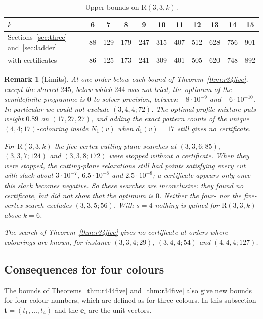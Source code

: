 \documentclass[11pt]{article}
\theoremstyle{spacedplain}
\theoremstyle{spaceddef}
\theoremstyle{spacedremark}
\newtheorem{remark}[theorem]{Remark}
\newcommand{\R}{\mathrm{R}}
\newcommand{\bt}{\mathbf{t}}
\newcommand{\e}{\mathbf{e}}
\begin{document}
\begin{table}[htbp]
\centering\small
\begin{tabular}{l*{10}{c}}
\toprule
$k$ & 6 & 7 & 8 & 9 & 10 & 11 & 12 & 13 & 14 & 15\\
\midrule
Sections~\ref{sec:three} and~\ref{sec:ladder} & 88 & 129 & 179 & 247 & 315 & 407 & 512 & 628 & 756 & 901\\
with certificates & 86 & 125 & 173 & 241 & 309 & 401 & 505 & 620 & 748 & 892\\
\bottomrule
\end{tabular}
\caption{Upper bounds on $\R(3,3,k)$.}
\label{tab:flagladder}
\end{table}

\begin{remark}[Limits]\label{rem:limits}
At one order below each bound of Theorem~\ref{thm:r34five}, except the starred $245$, below which $244$ was not tried, the optimum of the semidefinite programme is $0$ to solver precision, between $-8\cdot10^{-9}$ and $-6\cdot10^{-10}$.
In particular we could not exclude $(3,4,4;72)$.
The optimal profile mixture puts weight $0.89$ on $(17,27,27)$, and adding the exact pattern counts of the unique $(4,4;17)$-colouring \cite{Rad26} inside $N_1(v)$ when $d_1(v)=17$ still gives no certificate.

For $\R(3,3,k)$ the five-vertex cutting-plane searches at $(3,3,6;85)$, $(3,3,7;124)$ and $(3,3,8;172)$ were stopped without a certificate.
When they were stopped, the cutting-plane relaxations still had points satisfying every cut with slack about $3\cdot10^{-7}$, $6.5\cdot10^{-8}$ and $2.5\cdot10^{-8}$; a certificate appears only once this slack becomes negative.
So these searches are inconclusive: they found no certificate, but did not show that the optimum is $0$.
Neither the four- nor the five-vertex search excludes $(3,3,5;56)$.
With $s=4$ nothing is gained for $\R(3,3,k)$ above $k=6$.

The search of Theorem~\ref{thm:r34five} gives no certificate at orders where colourings are known, for instance $(3,3,4;29)$, $(3,4,4;54)$ and $(4,4,4;127)$.
\end{remark}

\subsection{Consequences for four colours}\label{sec:four}

The bounds of Theorems~\ref{thm:r444five} and~\ref{thm:r34five} also give new bounds for four-colour numbers, which are defined as for three colours.
In this subsection $\bt=(t_1,\dots,t_4)$ and the $\e_i$ are the unit vectors.
\end{document}
